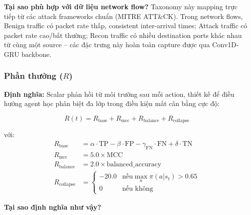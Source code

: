 \documentclass[12pt,a4paper]{article}
\begin{document}
\textbf{Tại sao phù hợp với dữ liệu network flow?} Taxonomy này mapping trực tiếp từ các attack frameworks chuẩn (MITRE ATT\&CK). Trong network flows, Benign traffic có packet rate thấp, consistent inter-arrival times; Attack traffic có packet rate cao/bất thường; Recon traffic có nhiều destination ports khác nhau từ cùng một source -- các đặc trưng này hoàn toàn capture được qua Conv1D-GRU backbone.

\subsubsection{Phần thưởng ($R$)}

\textbf{Định nghĩa:} Scalar phản hồi từ môi trường sau mỗi action, thiết kế để điều hướng agent học phân biệt đa lớp trong điều kiện mất cân bằng cực độ:

\begin{equation}\label{eq:reward_total}
    R(t) = R_{\text{base}} + R_{\text{mcc}} + R_{\text{balance}} + R_{\text{collapse}}
\end{equation}

với:
\begin{align}
    R_{\text{base}} &= \alpha \cdot \text{TP} - \beta \cdot \text{FP} - \gamma_{\text{FN}} \cdot \text{FN} + \delta \cdot \text{TN} \label{eq:r_base} \\
    R_{\text{mcc}} &= 5.0 \times \text{MCC} \label{eq:r_mcc} \\
    R_{\text{balance}} &= 2.0 \times \text{balanced\_accuracy} \label{eq:r_balance} \\
    R_{\text{collapse}} &= \begin{cases} -20.0 & \text{nếu} \max_a \pi(a|s_t) > 0.65 \\ 0 & \text{nếu không} \end{cases} \label{eq:r_collapse}
\end{align}

\textbf{Tại sao định nghĩa như vậy?}
\end{document}
